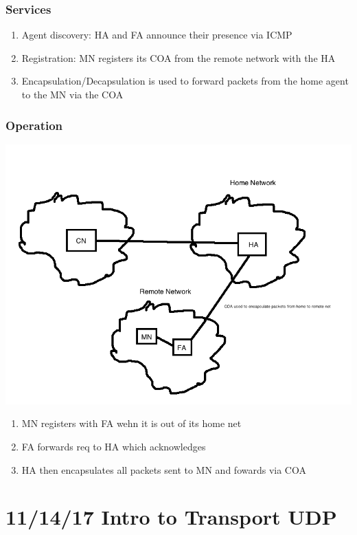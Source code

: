 \documentclass[11pt]{article}
\begin{document}
\subsubsection{Services}
\label{sec:orgheadline114}
\begin{enumerate}
\item Agent discovery: HA and FA announce their presence via ICMP
\item Registration: MN registers its COA from the remote network with the
HA
\item Encapsulation/Decapsulation is used to forward packets from the
home agent to the MN via the COA
\end{enumerate}

\subsubsection{Operation}
\label{sec:orgheadline115}
\includegraphics[width=.9\linewidth]{diagrams/mobileip.png}
\begin{enumerate}
\item MN registers with FA wehn it is out of its home net
\item FA forwards req to HA which acknowledges
\item HA then encapsulates all packets sent to MN and fowards via COA
\end{enumerate}

\section{11/14/17 Intro to Transport UDP}
\label{sec:orgheadline124}
\end{document}
